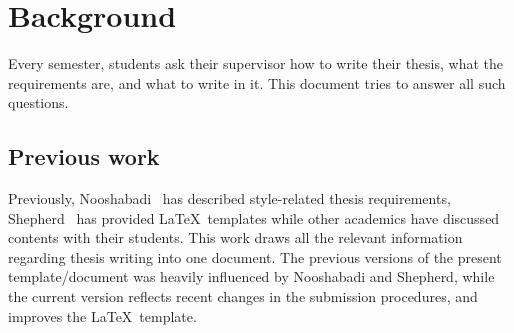 \chapter{Background}\label{ch:background}

Every semester, students ask their supervisor how to write their thesis,
what the requirements are, and what to write in it.  
This document tries to answer all such questions.

\section{Previous work}

Previously, Nooshabadi~\cite{Noo05} has described style-related thesis
requirements, Shepherd~\cite{She05} has provided \LaTeX\ templates while
other academics have discussed contents with their students.  This work
draws all the relevant information regarding thesis writing into one
document.  The previous versions of the present template/document was heavily
influenced by Nooshabadi and Shepherd, while the current version reflects recent
changes in the submission procedures, and improves the \LaTeX\ template.
